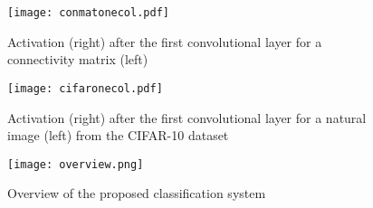 \begin{figure}[t]
    \centering
    \texttt{[image: conmatonecol.pdf]}
    \caption{Activation (right) after the first convolutional layer for a connectivity matrix (left)}
    \label{fig:actconmat}
\end{figure}

\begin{figure}[t]
    \texttt{[image: cifaronecol.pdf]}
    \caption{Activation (right) after the first convolutional layer for a natural image (left) from the CIFAR-10 dataset }
    \label{fig:actcifar}
\end{figure}

\begin{figure*}[t]
    \centering
    \texttt{[image: overview.png]}  %
    \caption{Overview of the proposed classification system}
    \label{fig:overview}
\end{figure*}